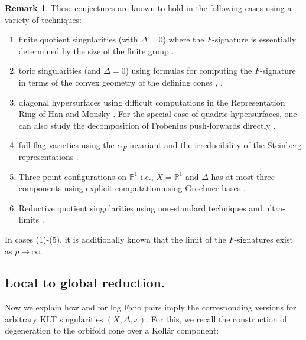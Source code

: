 \documentclass[11pt,reqno]{amsart}
\newcommand{\PP}{\mathbb{P}}
\numberwithin{equation}{section}
\theoremstyle{definition}
\newtheorem{rem}[prop] {Remark}
\newcommand{\FA}{\alpha_{F}}
\begin{document}
\begin{rem}
    These conjectures are known to hold in the following cases using a variety of techniques:
    \begin{enumerate}
        \item finite quotient singularities (with $\Delta = 0$) where the $F$-signature is essentially determined by the size of the finite group   \cite{HunekeLeuschkeTwoTheoremsAboutMaximal}.
        
        \item toric singularities (and $\Delta = 0$) using formulas for computing the $F$-signature in terms of the convex geometry of the defining cones  \cite{SinghFSignatureOfAffineSemigroup}, \cite{VonKorffthesis}.
        
        \item diagonal hypersurfaces using difficult computations in the Representation Ring of Han and Monsky \cite{CaminataShidelerTuckerZermanFsignatureofdiagonalhypersurfaces}. For the special case of quadric hypersurfaces, one can also study the decomposition of Frobenius push-forwards directly \cite{TrivediHKDensitfunctionofquadrics}. 
        \item full flag varieties using the $\FA$-invariant and the irreducibility of the Steinberg representations \cite{PandeFrobeniusAlpha}.
        \item Three-point configurations on $\PP^1$ i.e., $X = \PP^1$ and $\Delta $ has at most three components using explicit computation using Groebner bases \cite{BCPTlimitFsigarxiv}.
        \item Reductive quotient singularities using non-standard techniques and ultra-limits \cite{TakagiYamaguchiUniformPositivity}.
    \end{enumerate}
    In cases (1)-(5), it is additionally known that the limit of the $F$-signatures exist as $p \to \infty$.
\end{rem}

\subsection{Local to global reduction.}
Now we explain how  and  for log Fano pairs imply the corresponding versions for arbitrary KLT singularities $(X,\Delta,x)$. For this, we recall the construction of degeneration to the orbifold cone over a Koll\'ar component:
\end{document}
